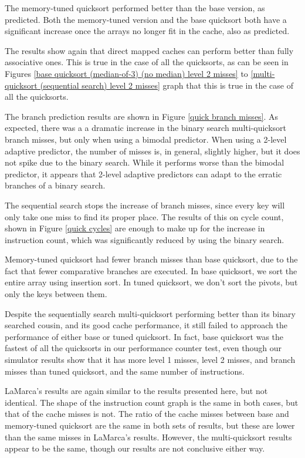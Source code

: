 The memory-tuned quicksort performed better than the base version, as predicted.
Both the memory-tuned version and the base quicksort both have a significant
increase once the arrays no longer fit in the cache, also as predicted.

The results show again that direct mapped caches can perform better than fully
associative ones. This is true in the case of all the quicksorts, as can be seen
in Figures \ref{base quicksort (median-of-3) (no median) level 2 misses} to
\ref{multi-quicksort (sequential search) level 2 misses} graph that this is true
in the case of all the quicksorts.

The branch prediction results are shown in Figure \ref{quick branch misses}. As
expected, there was a a dramatic increase in the binary search multi-quicksort
branch misses, but only when using a bimodal predictor. When using a 2-level
adaptive predictor, the number of misses is, in general, slightly higher, but it
does not spike due to the binary search. While it performs worse than the
bimodal predictor, it appears that 2-level adaptive predictors can adapt to the
erratic branches of a binary search.

The sequential search stops the increase of branch misses, since every key will
only take one miss to find its proper place. The results of this on cycle
count, shown in Figure \ref{quick cycles} are enough to make up for the increase
in instruction count, which was significantly reduced by using the binary
search.

Memory-tuned quicksort had fewer branch misses than base quicksort, due to the fact
that fewer comparative branches are executed. In base quicksort, we sort the
entire array using insertion sort. In tuned quicksort, we don't sort the pivots,
but only the keys between them.

Despite the sequentially search multi-quicksort performing better than its
binary searched cousin, and its good cache performance, it still failed to
approach the performance of either base or tuned quicksort. In fact, base
quicksort was the fastest of all the quicksorts in our performance counter test,
even though our simulator results show that it has more level 1 misses, level 2
misses, and branch misses than tuned quicksort, and the same number of
instructions.

LaMarca's results are again similar to the results presented here, but not
identical. The shape of the instruction count graph is the same in both cases,
but that of the cache misses is not. The ratio of the cache misses between base
and memory-tuned quicksort are the same in both sets of results, but these are lower
than the same misses in LaMarca's results. However, the multi-quicksort results
appear to be the same, though our results are not conclusive either way.


